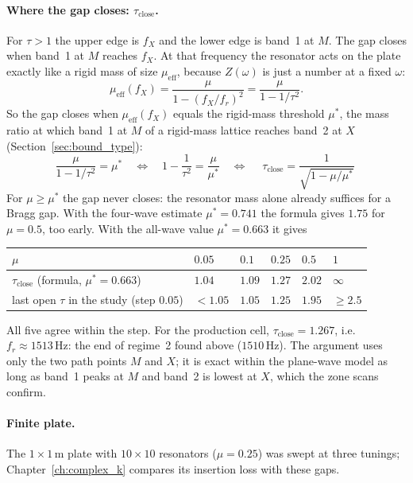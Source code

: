 \paragraph{Where the gap closes: $\tau_\text{close}$.} For $\tau > 1$ the upper edge is
$f_X$ and the lower edge is band~1 at $M$. The gap closes when band~1 at $M$ reaches
$f_X$. At that frequency the resonator acts on the plate exactly like a rigid mass of
size $\mu_\mathrm{eff}$, because $Z(\omega)$ is just a number at a fixed $\omega$:
\begin{equation}
  \mu_\mathrm{eff}(f_X) = \frac{\mu}{1 - (f_X/f_r)^2} = \frac{\mu}{1 - 1/\tau^2} .
\end{equation}
So the gap closes when $\mu_\mathrm{eff}(f_X)$ equals the rigid-mass threshold $\mu^*$,
the mass ratio at which band~1 at $M$ of a rigid-mass lattice reaches band~2 at $X$
(Section~\ref{sec:bound_type}):
\begin{equation}
  \frac{\mu}{1 - 1/\tau^2} = \mu^*
  \quad\Longleftrightarrow\quad
  1 - \frac{1}{\tau^2} = \frac{\mu}{\mu^*}
  \quad\Longleftrightarrow\quad
  \boxed{\;\tau_\text{close} = \frac{1}{\sqrt{1 - \mu/\mu^*}}\;}
\end{equation}
For $\mu \ge \mu^*$ the gap never closes: the resonator mass alone already suffices
for a Bragg gap. With the four-wave estimate $\mu^* = 0.741$ the formula gives $1.75$ for
$\mu = 0.5$, too early. With the all-wave value $\mu^* = 0.663$ it gives
\begin{center}
\begin{tabular}{|l|l|l|l|l|l|}
\hline
$\mu$ & $0.05$ & $0.1$ & $0.25$ & $0.5$ & $1$ \\
\hline
$\tau_\text{close}$ (formula, $\mu^* = 0.663$) & $1.04$ & $1.09$ & $1.27$ & $2.02$ & $\infty$ \\
last open $\tau$ in the study (step $0.05$) & $< 1.05$ & $1.05$ & $1.25$ & $1.95$ & $\ge 2.5$ \\
\hline
\end{tabular}
\end{center}
All five agree within the step. For the production cell, $\tau_\text{close} = 1.267$,
i.e.\ $f_r \approx 1513\,\mathrm{Hz}$: the end of regime~2 found above
($1510\,\mathrm{Hz}$). The argument uses only the two path points $M$ and $X$; it is
exact within the plane-wave model as long as band~1 peaks at $M$ and band~2 is lowest
at $X$, which the zone scans confirm.

\paragraph{Finite plate.} The $1 \times 1\,\mathrm{m}$ plate with $10 \times 10$
resonators ($\mu = 0.25$) was swept at three tunings; Chapter~\ref{ch:complex_k}
compares its insertion loss with these gaps.

